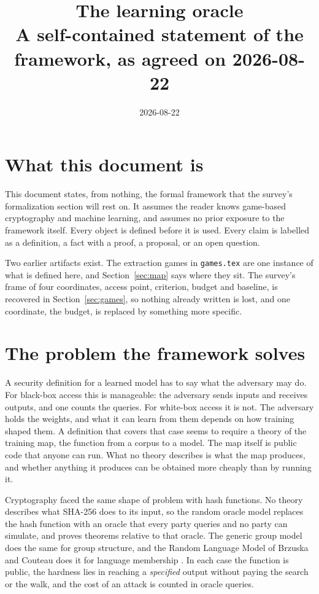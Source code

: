 \documentclass[11pt]{article}
\title{The learning oracle\\
\large A self-contained statement of the framework, as agreed on 2026-08-22}
\author{}
\date{2026-08-22}
\theoremstyle{definition}
\theoremstyle{plain}
\theoremstyle{remark}
\begin{document}
\maketitle

\tableofcontents

\section{What this document is}

This document states, from nothing, the formal framework that the survey's
formalization section will rest on. It assumes the reader knows game-based
cryptography and machine learning, and assumes no prior exposure to the framework
itself. Every object is defined before it is used. Every claim is labelled as a
definition, a fact with a proof, a proposal, or an open question.

Two earlier artifacts exist. The extraction games in \texttt{games.tex} are one
instance of what is defined here, and Section~\ref{sec:map} says where they sit.
The survey's frame of four coordinates, access point, criterion, budget and
baseline, is recovered in Section~\ref{sec:games}, so nothing already written is
lost, and one coordinate, the budget, is replaced by something more specific.

\section{The problem the framework solves}
\label{sec:problem}

A security definition for a learned model has to say what the adversary may do.
For black-box access this is manageable: the adversary sends inputs and receives
outputs, and one counts the queries. For white-box access it is not. The adversary
holds the weights, and what it can learn from them depends on how training shaped
them. A definition that covers that case seems to require a theory of the training
map, the function from a corpus to a model. The map itself is public code that
anyone can run. What no theory describes is what the map produces, and whether
anything it produces can be obtained more cheaply than by running it.

Cryptography faced the same shape of problem with hash functions. No theory
describes what SHA-256 does to its input, so the random oracle model replaces the
hash function with an oracle that every party queries and no party can simulate,
and proves theorems relative to that oracle. The generic group model does the same
for group structure, and the Random Language Model of Brzuska and Couteau does it
for language membership \cite{BC22}. In each case the function is public, the hardness lies in reaching a
\emph{specified} output without paying the search or the walk, and the cost of an
attack is counted in oracle queries.
\end{document}
